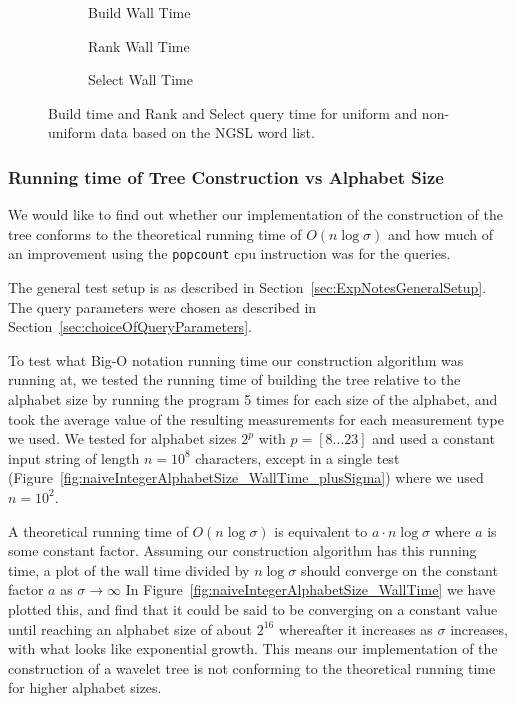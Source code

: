 \begin{figure}\tiny
	\begin{subfigure}{0.31\textwidth}
		
		\caption{Build Wall Time}
		\label{fig:UniformVsNonUniform_Build_WallTime}
	\end{subfigure}
	\hfill
	\begin{subfigure}{0.31\textwidth}
		
		\caption{Rank Wall Time}
		\label{fig:UniformVsNonUniform_Rank_WallTime}
	\end{subfigure}	
	\hfill
	\begin{subfigure}{0.31\textwidth}
		
		\caption{Select Wall Time}
		\label{fig:UniformVsNonUniform_Select_WallTime}
	\end{subfigure}
\caption{Build time and Rank and Select query time for uniform and non-uniform data based on the NGSL word list.}
\label{fig:UniformVsNonUniform}
\end{figure}

\subsubsection{Running time of Tree Construction vs Alphabet Size}

We would like to find out whether our implementation of the construction of the tree conforms to the theoretical running time of $O(n \log \sigma)$ and how much of an improvement using the \texttt{popcount} cpu instruction was for the queries.

The general test setup is as described in Section~\ref{sec:ExpNotesGeneralSetup}.
The query parameters were chosen as described in Section~\ref{sec:choiceOfQueryParameters}.

To test what Big-O notation running time our construction algorithm was running at, we tested the running time of building the tree relative to the alphabet size by running the program 5 times for each size of the alphabet, and took the average value of the resulting measurements for each measurement type we used.
We tested for alphabet sizes $2^p$ with $p = [8...23]$ and used a constant input string of length $n = 10^8$ characters, except in a single test (Figure~\ref{fig:naiveIntegerAlphabetSize_WallTime_plusSigma}) where we used $n = 10^2$.

A theoretical running time of $O(n \log\sigma)$ is equivalent to $a \cdot n \log\sigma$ where $a$ is some constant factor.
Assuming our construction algorithm has this running time, a plot of the wall time divided by $n \log\sigma$ should converge on the constant factor $a$ as $\sigma \rightarrow \infty$
In Figure~\ref{fig:naiveIntegerAlphabetSize_WallTime} we have plotted this, and find that it could be said to be converging on a constant value until reaching an alphabet size of about $2^{16}$ whereafter it increases as $\sigma$ increases, with what looks like exponential growth.
This means our implementation of the construction of a wavelet tree is not conforming to the theoretical running time for higher alphabet sizes.



